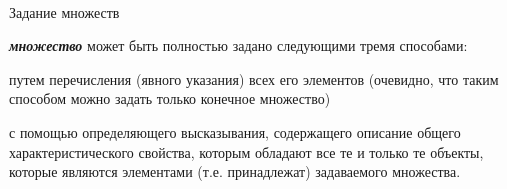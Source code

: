 \begin{frame}{\\Задание множеств}%
	\topline
	\justifying
		
	\textbf{\textit{множество}} может быть полностью задано следующими тремя способами:
	
	\begin{textitemize}
	\item путем перечисления (явного указания) всех его элементов (очевидно, что таким способом можно задать только конечное множество)
    \end{textitemize}

\vspace{2em}   

\vspace{-4em}   	 
\end{frame}

\begin{frame}%
	
	\begin{textitemize}	    
	\item с помощью определяющего высказывания, содержащего описание общего характеристического свойства, которым обладают все те и только те объекты, которые являются элементами (т.е. принадлежат) задаваемого множества.
    \end{textitemize}

\vspace{2em}

\vspace{-6em}      
\end{frame}

